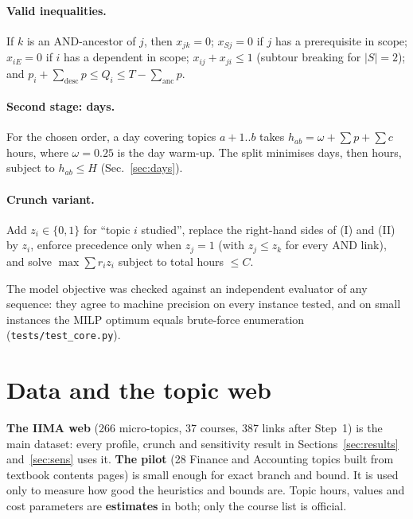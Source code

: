 \documentclass[11pt,a4paper]{article}
\begin{document}
\paragraph{Valid inequalities.} If $k$ is an AND-ancestor of $j$, then $x_{jk}=0$; $x_{Sj}=0$ if $j$ has a prerequisite in scope; $x_{iE}=0$ if $i$ has a dependent in scope; $x_{ij}+x_{ji}\le 1$ (subtour breaking for $|S|=2$); and $p_i+\sum_{\text{desc}}p \le Q_i \le T-\sum_{\text{anc}}p$.

\paragraph{Second stage: days.} For the chosen order, a day covering topics $a{+}1..b$ takes $h_{ab}=\omega+\sum p+\sum c$ hours, where $\omega=0.25$ is the day warm-up. The split minimises days, then hours, subject to $h_{ab}\le H$ (Sec.~\ref{sec:days}).

\paragraph{Crunch variant.} Add $z_i\in\{0,1\}$ for ``topic $i$ studied'', replace the right-hand sides of (I) and (II) by $z_i$, enforce precedence only when $z_j=1$ (with $z_j\le z_k$ for every AND link), and solve $\max\sum r_iz_i$ subject to total hours $\le C$.

The model objective was checked against an independent evaluator of any sequence: they agree to machine precision on every instance tested, and on small instances the MILP optimum equals brute-force enumeration (\texttt{tests/test\_core.py}).

\section{Data and the topic web}
\label{sec:data}
\begin{statusbox}
\textbf{The IIMA web} (266 micro-topics, 37 courses, 387 links after Step~1) is the main dataset: every profile, crunch and sensitivity result in Sections~\ref{sec:results} and~\ref{sec:sens} uses it. \textbf{The pilot} (28 Finance and Accounting topics built from textbook contents pages) is small enough for exact branch and bound. It is used only to measure how good the heuristics and bounds are. Topic hours, values and cost parameters are \textbf{estimates} in both; only the course list is official.
\end{statusbox}
\end{document}
